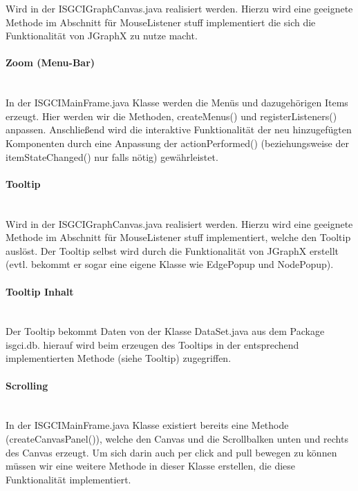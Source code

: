 \documentclass[10pt,a4paper]{article}
\begin{document}
Wird in der ISGCIGraphCanvas.java realisiert werden. Hierzu wird eine geeignete Methode im Abschnitt für MouseListener stuff implementiert die sich die Funktionalität von JGraphX zu nutze macht.

\paragraph{Zoom (Menu-Bar)}\ \\ 

In der ISGCIMainFrame.java Klasse werden die Menüs und dazugehörigen Items erzeugt. Hier werden wir die Methoden, createMenus() und registerListeners() anpassen. Anschließend wird die interaktive Funktionalität der neu hinzugefügten Komponenten durch eine Anpassung der actionPerformed() (beziehungsweise der itemStateChanged() nur falls nötig) gewährleistet.

\paragraph{Tooltip}\ \\ 

Wird in der ISGCIGraphCanvas.java realisiert werden. Hierzu wird eine geeignete Methode im Abschnitt für MouseListener stuff implementiert, welche den Tooltip auslöst. Der Tooltip selbst wird durch die Funktionalität von JGraphX erstellt (evtl. bekommt er sogar eine eigene Klasse wie EdgePopup und NodePopup).

\paragraph{Tooltip Inhalt}\ \\ 

 Der Tooltip bekommt Daten von der Klasse DataSet.java aus dem Package isgci.db. hierauf wird beim erzeugen des Tooltips in der entsprechend implementierten Methode (siehe Tooltip) zugegriffen.


\paragraph{Scrolling}\ \\ 

In der ISGCIMainFrame.java Klasse existiert bereits eine Methode (createCanvasPanel()), welche den Canvas und die Scrollbalken unten und rechts des Canvas erzeugt. Um sich darin auch per click and pull bewegen zu können müssen wir eine weitere Methode in dieser Klasse erstellen, die diese Funktionalität implementiert.
\end{document}
